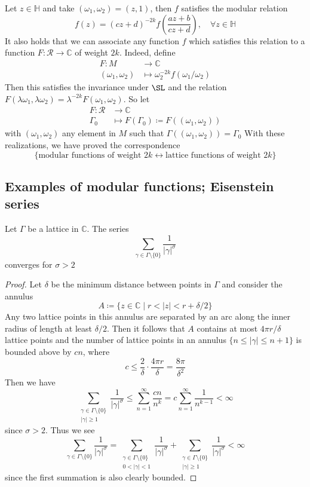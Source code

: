 \documentclass[12pt]{article}
\theoremstyle{definition}
\begin{document}
Let \(z\in \mathbb{H} \) and take \((\omega _1,\omega _2) = (z,1)\), then \(f\) satisfies the modular relation 
\[
    f(z) = (cz+d)^{-2k} f\left(\frac{az+b}{cz+d}\right), \quad \forall z \in \mathbb{H} 
\] 
It also holds that we can associate any function \(f\) which satisfies this relation to a function \(F:\mathscr{R} \to  \mathbb{C} \) of weight \(2k\). Indeed, define 
\begin{align*}
F: M &\to  \mathbb{C} \\
(\omega_1,\omega _2) &\mapsto \omega _2^{-2k}f(\omega_1/\omega_2)
\end{align*}
Then this satisfies the invariance under \(\SL\) and the relation \(F(\lambda \omega _1,\lambda \omega _2) = \lambda ^{-2k} F(\omega _1,\omega _2)\). So let 
\begin{align*}
F: \mathscr{R} &\to \mathbb{C} \\
\Gamma_0 &\mapsto F(\Gamma_0 )\coloneqq F((\omega _1,\omega _2))
\end{align*}
with \((\omega _1,\omega _2)\) any element in \(M\) such that \(\Gamma ((\omega _1,\omega _2))=\Gamma _0\)   
With these realizations, we have proved the correspondence
\[
    \{ \textrm{modular functions of weight } 2k \longleftrightarrow \textrm{lattice functions of weight } 2k \} 
\]   

\subsection{Examples of modular functions; Eisenstein series}
\begin{lem}
Let \(\Gamma \) be a lattice in \(\mathbb{C} \). The series
\[
    \sum_{\gamma \in \Gamma\setminus \{ 0 \}  }\frac{1}{\vert \gamma \vert^\sigma  } 
\]  
converges for \(\sigma >2\) 
\end{lem}
\begin{proof}
Let \(\delta \) be the minimum distance between points in \(\Gamma \) and consider the annulus 
\[
    A \coloneqq \{ z\in \mathbb{C} \mid r< \vert z \vert <r+\delta /2 \} 
\]   
Any two lattice points in this annulus are separated by an arc along the inner radius of length at least \(\delta /2\). Then it follows that \(A\) contains at most \(4\pi r/\delta \) lattice points and the number of lattice points in an annulus \(\{n\leq \vert \gamma\vert \leq n+1\}\) is bounded above by \(cn\), where 
\[
    c \leq \frac{2}{\delta } \cdot \frac{4\pi r}{\delta } = \frac{8\pi }{\delta ^2}
\]      
Then we have 
\[
    \sum_{\substack{\gamma \in \Gamma\setminus \{ 0 \} \\ \vert \gamma  \vert \geq 1  }} \frac{1}{\vert \gamma  \vert^\sigma  }\leq  \sum_{n=1}^{\infty} \frac{cn}{n^k} = c \sum_{n=1}^{\infty} \frac{1}{n^{k-1}}<\infty   
\]
since \(\sigma >2\). Thus we see 
\[
    \sum_{\gamma \in \Gamma\setminus \{ 0 \}  } \frac{1}{\vert \gamma  \vert^\sigma  } = \sum_{\substack{\gamma \in \Gamma\setminus \{ 0 \}\\0< \vert \gamma  \vert <1} } \frac{1}{\vert \gamma  \vert^\sigma  } + \sum_{\substack{\gamma \in \Gamma\setminus \{ 0 \}\\ \vert \gamma  \vert \geq 1  }} \frac{1}{\vert \gamma  \vert^\sigma  } <\infty 
\] 
since the first summation is also clearly bounded.
\end{proof}
\end{document}
